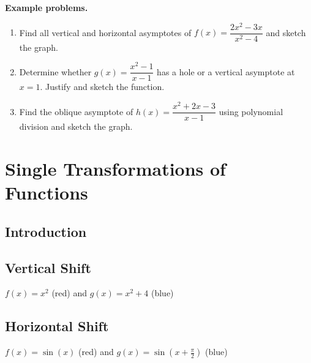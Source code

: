 \textbf{Example problems.}

\begin{enumerate}
    \item Find all vertical and horizontal asymptotes of $f(x) = \dfrac{2x^2 - 3x}{x^2 - 4}$ and sketch the graph.
    \item Determine whether $g(x) = \dfrac{x^2 - 1}{x - 1}$ has a hole or a vertical asymptote at $x = 1$. Justify and sketch the function.
    \item Find the oblique asymptote of $h(x) = \dfrac{x^2 + 2x - 3}{x - 1}$ using polynomial division and sketch the graph.
\end{enumerate}

\section{Single Transformations of Functions}
\label{sec:sing-9dfc}

\subsection{Introduction}
\label{sss:intr-8800}

\subsection{Vertical Shift}
\label{sss:vert-45b1}

$f(x) = x^2$ (red) and $g(x) = x^2 + 4$ (blue)


\subsection{Horizontal Shift}
\label{sss:hori-8d28}

$f(x) = \sin(x)$ (red) and $g(x) = \sin(x + \frac{\pi}{2})$ (blue)

